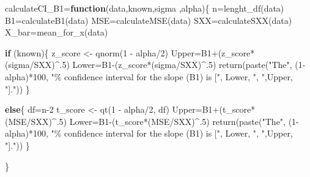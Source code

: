 \documentclass[
]{article}
\newenvironment{Shaded}{\begin{snugshade}}{\end{snugshade}}
\newcommand{\ControlFlowTok}[1]{\textcolor[rgb]{0.13,0.29,0.53}{\textbf{#1}}}
\newcommand{\DecValTok}[1]{\textcolor[rgb]{0.00,0.00,0.81}{#1}}
\newcommand{\FunctionTok}[1]{\textcolor[rgb]{0.00,0.00,0.00}{#1}}
\newcommand{\NormalTok}[1]{#1}
\newcommand{\OtherTok}[1]{\textcolor[rgb]{0.56,0.35,0.01}{#1}}
\newcommand{\SpecialCharTok}[1]{\textcolor[rgb]{0.00,0.00,0.00}{#1}}
\newcommand{\StringTok}[1]{\textcolor[rgb]{0.31,0.60,0.02}{#1}}
\begin{document}
\begin{Shaded}
\begin{Highlighting}[]
\NormalTok{calculateCI\_B1}\OtherTok{=}\ControlFlowTok{function}\NormalTok{(data,known,sigma ,alpha)\{}
\NormalTok{  n}\OtherTok{=}\FunctionTok{lenght\_df}\NormalTok{(data)}
\NormalTok{  B1}\OtherTok{=}\FunctionTok{calculateB1}\NormalTok{(data)}
\NormalTok{  MSE}\OtherTok{=}\FunctionTok{calculateMSE}\NormalTok{(data)}
\NormalTok{  SXX}\OtherTok{=}\FunctionTok{calculateSXX}\NormalTok{(data)}
\NormalTok{  X\_bar}\OtherTok{=}\FunctionTok{mean\_for\_x}\NormalTok{(data)}
  
  
  \ControlFlowTok{if}\NormalTok{ (known)\{}
\NormalTok{    z\_score }\OtherTok{\textless{}{-}} \FunctionTok{qnorm}\NormalTok{(}\DecValTok{1} \SpecialCharTok{{-}}\NormalTok{ alpha}\SpecialCharTok{/}\DecValTok{2}\NormalTok{)}
\NormalTok{    Upper}\OtherTok{=}\NormalTok{B1}\SpecialCharTok{+}\NormalTok{(z\_score}\SpecialCharTok{*}\NormalTok{(sigma}\SpecialCharTok{/}\NormalTok{SXX)}\SpecialCharTok{\^{}}\NormalTok{.}\DecValTok{5}\NormalTok{)}
\NormalTok{    Lower}\OtherTok{=}\NormalTok{B1}\SpecialCharTok{{-}}\NormalTok{(z\_score}\SpecialCharTok{*}\NormalTok{(sigma}\SpecialCharTok{/}\NormalTok{SXX)}\SpecialCharTok{\^{}}\NormalTok{.}\DecValTok{5}\NormalTok{)}
    \FunctionTok{return}\NormalTok{(}\FunctionTok{paste}\NormalTok{(}\StringTok{"The"}\NormalTok{, (}\DecValTok{1}\SpecialCharTok{{-}}\NormalTok{alpha)}\SpecialCharTok{*}\DecValTok{100}\NormalTok{, }\StringTok{"\% confidence interval for the slope (B1) is ["}\NormalTok{, Lower, }\StringTok{", "}\NormalTok{,Upper, }\StringTok{"]."}\NormalTok{))}
\NormalTok{  \}}
  
  \ControlFlowTok{else}\NormalTok{\{}
\NormalTok{    df}\OtherTok{=}\NormalTok{n}\DecValTok{{-}2}
\NormalTok{    t\_score }\OtherTok{\textless{}{-}} \FunctionTok{qt}\NormalTok{(}\DecValTok{1} \SpecialCharTok{{-}}\NormalTok{ alpha}\SpecialCharTok{/}\DecValTok{2}\NormalTok{, df)}
\NormalTok{    Upper}\OtherTok{=}\NormalTok{B1}\SpecialCharTok{+}\NormalTok{(t\_score}\SpecialCharTok{*}\NormalTok{(MSE}\SpecialCharTok{/}\NormalTok{SXX)}\SpecialCharTok{\^{}}\NormalTok{.}\DecValTok{5}\NormalTok{)}
\NormalTok{    Lower}\OtherTok{=}\NormalTok{B1}\SpecialCharTok{{-}}\NormalTok{(t\_score}\SpecialCharTok{*}\NormalTok{(MSE}\SpecialCharTok{/}\NormalTok{SXX)}\SpecialCharTok{\^{}}\NormalTok{.}\DecValTok{5}\NormalTok{)}
    \FunctionTok{return}\NormalTok{(}\FunctionTok{paste}\NormalTok{(}\StringTok{"The"}\NormalTok{, (}\DecValTok{1}\SpecialCharTok{{-}}\NormalTok{alpha)}\SpecialCharTok{*}\DecValTok{100}\NormalTok{, }\StringTok{"\% confidence interval for the slope (B1) is ["}\NormalTok{, Lower, }\StringTok{", "}\NormalTok{,Upper, }\StringTok{"]."}\NormalTok{))}
\NormalTok{  \}}
  
\NormalTok{\}}
\end{Highlighting}
\end{Shaded}
\end{document}
